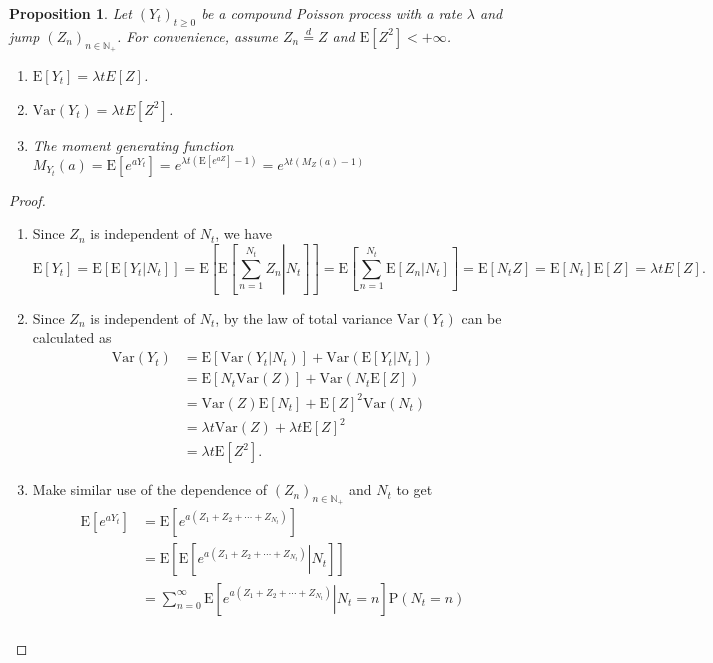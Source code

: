 \documentclass{article}
\newtheorem{proposition}{Proposition}[section]
\theoremstyle{nonumberplain}
\newtheorem{proof}{Proof.}
\begin{document}
\begin{proposition}
	Let $(Y_t)_{t\ge 0}$ be a compound Poisson process with a rate $\lambda$ and jump $(Z_n)_{n\in \mathbb{N}_+}$. For convenience, assume $Z_n\overset{d}{=}Z$ and $\mathrm{E}[Z^2]<+\infty$.
	\begin{enumerate}
		\item $\mathrm{E}[Y_t]=\lambda tE[Z]$.
		\item $\mathrm{Var}(Y_t)=\lambda tE[Z^2]$.
		\item The moment generating function $M_{Y_t}(a)=\mathrm{E}[e^{aY_t}]=e^{\lambda t(\mathrm{E}[e^{aZ}]-1)}=e^{\lambda t(M_Z(a)-1)}$
	\end{enumerate}
\end{proposition}
\begin{proof}\hspace*{1em}	
\begin{enumerate}
	\item Since $Z_n$ is independent of $N_t$, we have $$\mathrm{E}[Y_t]=\mathrm{E}[\mathrm{E}[Y_t|N_t]]=\mathrm{E}\left[\mathrm{E}\left[\left.\sum _{n=1}^{N_t}Z_{n}\right|N_t\right]\right]=\mathrm{E}\left[\sum _{n=1}^{N_t}\mathrm{E}\left[\left.Z_{n}\right|N_t\right]\right]=\mathrm{E}[N_tZ]=\mathrm{E}[N_t]\mathrm{E}[Z]=\lambda tE[Z].$$
	\item Since $Z_n$ is independent of $N_t$, by the law of total variance $\mathrm{Var}(Y_t)$ can be calculated as
	\begin{align*}
		\mathrm{Var}(Y_t)&=\mathrm{E}[\mathrm{Var}(Y_t|N_t)]+\mathrm{Var}(\mathrm{E}[Y_t|N_t])\\
		&=\mathrm{E}[N_t\mathrm{Var}(Z)]+\mathrm{Var}(N_t\mathrm{E}[Z])\\
		&=\mathrm{Var}(Z)\mathrm{E}[N_t]+\mathrm{E}[Z]^2\mathrm{Var}(N_t)\\
		&=\lambda t\mathrm{Var}(Z)+\lambda t\mathrm{E}[Z]^2\\
		&=\lambda t \mathrm{E}[Z^2].
	\end{align*}
	\item Make similar use of the dependence of $(Z_n)_{n\in\mathbb{N_+}}$ and $N_t$ to get
	\[
	\begin{aligned}
	\mathrm{E}\left[e^{aY_t}\right]&=\mathrm{E}\left[e^{a\left(Z_1+Z_2+\cdots+Z_{N_t}\right)}\right]\\
	&=\mathrm{E}\left[\mathrm{E}\left[\left.e^{a\left(Z_1+Z_2+\cdots+Z_{N_t}\right)}\right|N_t\right]\right]\\
	&=\sum_{n=0}^{\infty}\mathrm{E}\left[\left.e^{a\left(Z_1+Z_2+\cdots+Z_{N_t}\right)}\right|N_t=n\right]\mathrm{P}\left(N_t=n\right)\\

\end{aligned}\]
\end{enumerate}
\end{proof}
\end{document}
